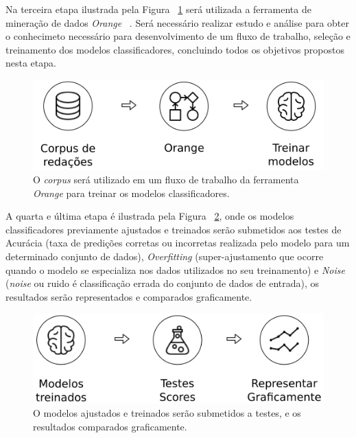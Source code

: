 Na terceira etapa ilustrada pela Figura ~\ref{fig:metodologia_3} será utilizada a ferramenta de mineração de dados \textit{Orange} ~\cite{JMLR:demsar13a}. Será necessário realizar estudo e análise para obter o conhecimeto necessário para desenvolvimento de um fluxo de trabalho, seleção e treinamento dos modelos classificadores, concluindo todos os objetivos propostos nesta etapa.

\begin{figure}[H]
\begin{center}
    \includegraphics[scale=0.75]{figuras/metodologia_3.png}
\end{center}
\caption{O \textit{corpus} será utilizado em um fluxo de trabalho da ferramenta \textit{Orange} para treinar os modelos classificadores.}
\label{fig:metodologia_3}
\end{figure}

A quarta e última etapa é ilustrada pela Figura ~\ref{fig:metodologia_4}, onde os modelos classificadores previamente ajustados e treinados serão submetidos aos testes de Acurácia (taxa de predições corretas ou incorretas realizada pelo modelo para um determinado conjunto de dados), \textit{Overfitting} (super-ajustamento que ocorre quando o modelo se especializa nos dados utilizados no seu treinamento) e \textit{Noise} (\textit{noise} ou ruido é classificação errada do conjunto de dados de entrada), os resultados serão representados e comparados graficamente.
\begin{figure}[H]
\begin{center}
    \includegraphics[scale=0.75]{figuras/metodologia_4.png}
\end{center}
\caption{O modelos ajustados e treinados serão submetidos a testes, e os resultados comparados graficamente.}
\label{fig:metodologia_4}
\end{figure}
